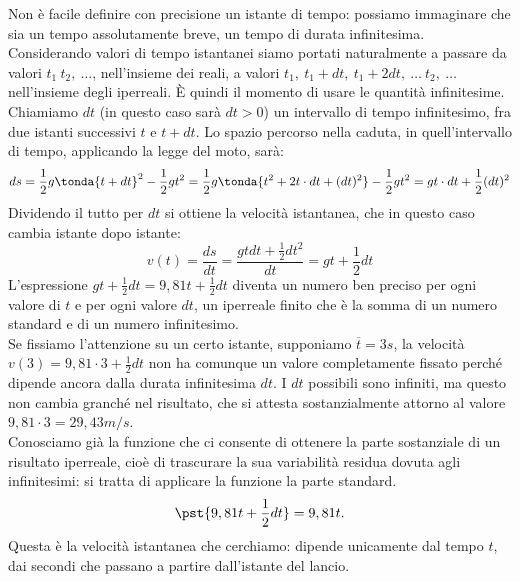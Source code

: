 Non è facile definire con precisione un istante di tempo: possiamo immaginare 
che sia un tempo assolutamente breve, un tempo di durata infinitesima.\\ 
Considerando valori di tempo istantanei siamo portati naturalmente a passare da 
valori \(t_1 \ t_2, \ \dots\), nell'insieme dei reali, a valori \(t_1, \ 
t_1+dt, \ 
t_1+2dt,\ \dots\ t_2, \ \dots\) nell'insieme degli iperreali. È quindi il 
momento 
di usare le quantità infinitesime.\\ Chiamiamo \(dt\) (in questo caso sarà \(dt 
> 
0\)) un intervallo di tempo infinitesimo, fra due istanti successivi \(t\) e 
\(t+dt\). Lo spazio percorso nella caduta, in quell'intervallo di tempo, 
applicando la legge del moto, sarà: 
\[ 
ds=\frac{1}{2}g\tonda{t+dt}^2-\frac{1}{2}gt^2= \frac{1}{2}g\tonda{t^2+2t\cdot 
dt+(dt)^2}-\frac{1}{2}gt^2= gt\cdot dt+\frac{1}{2}(dt)^2\] 
Dividendo il tutto 
per \(dt\) si ottiene la velocità istantanea, che in questo caso cambia istante 
dopo istante: 
\[v(t)=\frac{ds}{dt}=\frac{gtdt+\frac{1}{2}dt^2}{dt}=gt+\frac{1}{2}dt\] 
L'espressione \(gt+\frac{1}{2}dt=9,81t+\frac{1}{2}dt\) diventa un numero ben 
preciso per ogni valore di \(t\) e per ogni valore \(dt\), un iperreale finito 
che 
è 
la somma di un numero standard e di un numero infinitesimo.\\ Se fissiamo 
l'attenzione su un certo istante, supponiamo \(\overline{t}= 3s\), la velocità 
\(v(3)=9,81\cdot 3+\frac{1}{2}dt\) non ha comunque un valore completamente 
fissato 
perché dipende ancora dalla durata infinitesima \(dt\). I \(dt\) possibili sono 
infiniti, ma questo non cambia granché nel risultato, che si attesta 
sostanzialmente attorno al valore \(9,81\cdot 3=29,43m/s\).\\
Conosciamo già la funzione che ci consente di ottenere la parte sostanziale 
di un risultato iperreale, cioè di trascurare la sua variabilità 
residua dovuta agli infinitesimi: si tratta di applicare la funzione  
la parte standard.
\[ \pst{9,81t+\frac{1}{2}dt}=9,81t.\] 
Questa è la velocità istantanea che cerchiamo: dipende unicamente dal tempo 
\(t\), dai secondi che passano a partire dall'istante del lancio.

